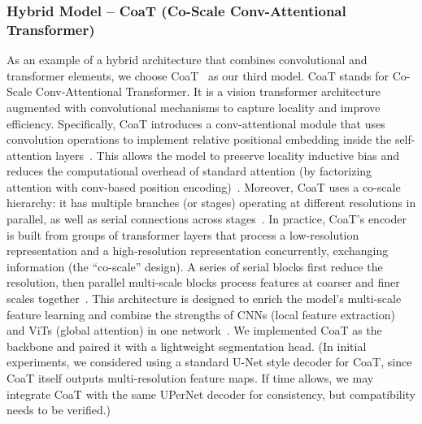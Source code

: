 \documentclass[conference]{IEEEtran}
\begin{document}
\subsubsection{Hybrid Model – CoaT (Co-Scale Conv-Attentional Transformer)}
As an example of a hybrid architecture that combines convolutional and transformer elements, we choose CoaT~\cite{xu_co-scale_2021} as our third model. CoaT stands for Co-Scale Conv-Attentional Transformer. It is a vision transformer architecture augmented with convolutional mechanisms to capture locality and improve efficiency. Specifically, CoaT introduces a conv-attentional module that uses convolution operations to implement relative positional embedding inside the self-attention layers~\cite{xu_co-scale_2021}. This allows the model to preserve locality inductive bias and reduces the computational overhead of standard attention (by factorizing attention with conv-based position encoding)~\cite{xu_co-scale_2021}. Moreover, CoaT uses a co-scale hierarchy: it has multiple branches (or stages) operating at different resolutions in parallel, as well as serial connections across stages~\cite{xu_co-scale_2021}. In practice, CoaT’s encoder is built from groups of transformer layers that process a low-resolution representation and a high-resolution representation concurrently, exchanging information (the “co-scale” design). A series of serial blocks first reduce the resolution, then parallel multi-scale blocks process features at coarser and finer scales together~\cite{xu_co-scale_2021}. This architecture is designed to enrich the model’s multi-scale feature learning and combine the strengths of CNNs (local feature extraction) and ViTs (global attention) in one network~\cite{xu_co-scale_2021}. We implemented CoaT as the backbone and paired it with a lightweight segmentation head. (In initial experiments, we considered using a standard U-Net style decoder for CoaT, since CoaT itself outputs multi-resolution feature maps. If time allows, we may integrate CoaT with the same UPerNet decoder for consistency, but compatibility needs to be verified.)
\end{document}
